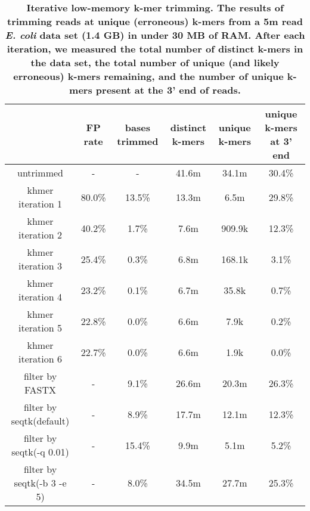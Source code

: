 \begin{table}[!ht]
\caption{
\bf{Iterative low-memory k-mer trimming.  The results of trimming
  reads at unique (erroneous) k-mers from a 5m read {\em E. coli} data set (1.4 GB)
  in under 30 MB of RAM.  After each iteration, we measured the
  total number of distinct k-mers in the data set, the total number
  of unique (and likely erroneous) k-mers remaining, and the
  number of unique k-mers present at the 3' end of reads.}}
\begin{tabular}{ | c | c | c | c | c | c |}
\hline
 & FP rate & bases trimmed & distinct k-mers & unique k-mers & 
unique k-mers at 3' end \\
\hline
untrimmed                           &      -  &      - & 41.6m & 34.1m & 30.4\%  \\
khmer iteration 1                   & 80.0\%  & 13.5\% & 13.3m &  6.5m & 29.8\% \\
khmer iteration 2                   & 40.2\%  &  1.7\% &  7.6m & 909.9k & 12.3\% \\
khmer iteration 3                   & 25.4\%  &  0.3\% &  6.8m & 168.1k & 3.1\% \\
khmer iteration 4                   & 23.2\%  &  0.1\% &  6.7m &  35.8k & 0.7\% \\
khmer iteration 5                   & 22.8\%  &  0.0\% &  6.6m &   7.9k & 0.2\% \\
khmer iteration 6                   & 22.7\%  &  0.0\% &  6.6m &   1.9k & 0.0\% \\
filter by FASTX                     &      -  &  9.1\% & 26.6m & 20.3m & 26.3\% \\
filter by seqtk(default)            &      -  &  8.9\% & 17.7m & 12.1m & 12.3\% \\
filter by seqtk(-q 0.01)            &      -  & 15.4\% &  9.9m &  5.1m &  5.2\% \\
filter by seqtk(-b 3 -e 5)          &      -  &  8.0\% & 34.5m & 27.7m & 25.3\% \\
\end{tabular}
\begin{flushleft}
\end{flushleft}
\label{table:loop_trim}
\end{table}



